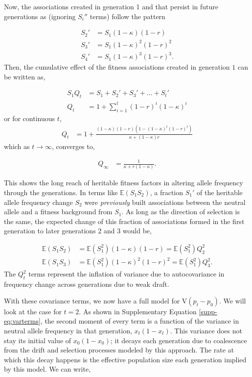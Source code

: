 \documentclass[11pt]{article}
\newcommand{\E}{\mathbb{E}}
\newcommand{\V}{\text{V}}
\begin{document}
Now, the associations created in generation 1 and that persist in future
generations as (ignoring $S_i''$ terms) follow the pattern

\begin{align}
  S_{2}' &= S_1 (1-\kappa)(1-r) \nonumber \\
  S_{3}' &= S_1 (1-\kappa)^2(1-r)^2 \nonumber \\
  S_{4}' &= S_1 (1-\kappa)^3(1-r)^3.
\end{align}
%
Then, the cumulative effect of the fitness associations created in generation
$1$ can be written as,

\begin{align}
  \label{eq:qterm}
  S_1 Q_t &= S_1 + S_2' + S_3' + \ldots + S_t' \nonumber \\
  Q_t &= 1 + \sum_{i=1}^t (1-r)^i(1-\kappa)^i
\end{align}
%
or for continuous $t$, 
%
\begin{align}
  \label{eq:q_t}
  Q_t &= 1+\frac{(1-\kappa) (1-r) \left(1-(1-\kappa)^t (1-r)^t\right)}{\kappa+(1-\kappa)r}
\end{align}
which as $t \to \infty$, converges to,

\begin{align}
  \label{eq:Qinf}
  Q_\infty &= \frac{1}{\kappa + r(1-\kappa)}.
\end{align}

This shows the long reach of heritable fitness factors in altering allele
frequency through the generations. In terms like $\E(S_1 S_2)$, a fraction
$S_1'$ of the heritable allele frequency change $S_2$ were \emph{previously}
built associations between the neutral allele and a fitness background from
$S_1$. As long as the direction of selection is the same, the expected change
of this fraction of associations formed in the first generation to later
generations 2 and 3 would be,

\begin{align}
  \E(S_1 S_2) &= \E(S_1^2) (1-\kappa)(1-r) = \E(S_1^2) Q_2^2 \nonumber \\
  \E(S_1 S_3) &= \E(S_1^2) (1-\kappa)^2(1-r)^2 = \E(S_1^2) Q_3^2.
\end{align}
%
The $Q_t^2$ terms represent the inflation of variance due to autocovariance in
frequency change across generations due to weak draft.

With these covariance terms, we now have a full model for $\V(p_t - p_0)$. We
will look at the case for $t=2$. As shown in Supplementary Equation \eqref{supp-eq:varterms},
the second moment of every term is a function of the variance in neutral allele
frequency in that generation, $x_t(1-x_t)$. This variance does not stay its
initial value of $x_0(1-x_0)$; it decays each generation due to coalescence
from the drift and selection processes modeled by this approach. The rate at
which this decay happens is the effective population size each generation
implied by this model. We can write,
\end{document}
